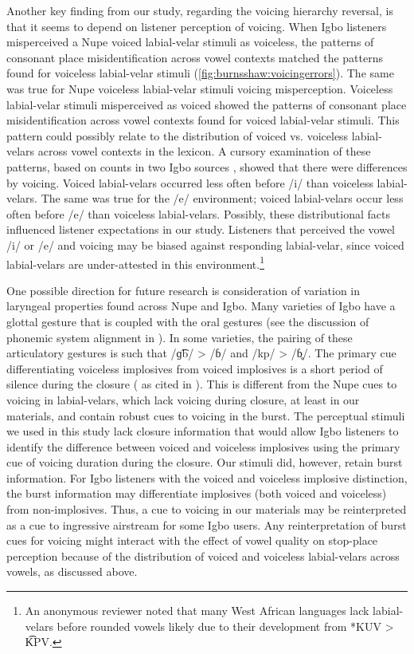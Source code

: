 \documentclass[output=paper,colorlinks,citecolor=brown
]{langscibook}
\begin{document}
Another key finding from our study, regarding the voicing hierarchy reversal, is that it seems to depend on listener perception of voicing. When Igbo listeners misperceived a Nupe voiced labial-velar stimuli as voiceless, the patterns of consonant place misidentification across vowel contexts matched the patterns found for voiceless labial-velar stimuli (\ref{fig:burnsshaw:voicingerrors}). The same was true for Nupe voiceless labial-velar stimuli voicing misperception. Voiceless labial-velar stimuli misperceived as voiced showed the patterns of consonant place misidentification across vowel contexts found for voiced labial-velar stimuli. This pattern could possibly relate to the distribution of voiced vs. voiceless labial-velars across vowel contexts in the lexicon. A cursory examination of these patterns, based on counts in two Igbo sources \citep{Igwe1999, Echeruo1998}, showed that there were differences by voicing. Voiced labial-velars occurred less often before /i/ than voiceless labial-velars. The same was true for the /e/ environment; voiced labial-velars occur less often before /e/ than voiceless labial-velars. Possibly, these distributional facts influenced listener expectations in our study. Listeners that perceived the vowel /i/ or /e/ and voicing may be biased against responding labial-velar, since voiced labial-velars are under-attested in this environment.\footnote{An anonymous reviewer noted that many West African languages lack labial-velars before rounded vowels likely due to their development from *KUV > K͡PV.}

One possible direction for future research is consideration of variation in laryngeal properties found across Nupe and Igbo. Many varieties of Igbo have a glottal gesture that is coupled with the oral gestures (see the discussion of phonemic system alignment in ). In some varieties, the pairing of these articulatory gestures is such that /ɡ͡b/ > /ɓ/ and /kp/ > /ɓ̥/. The primary cue differentiating voiceless implosives from voiced implosives is a short period of silence during the closure (\citealt{Ladefoged1976} as cited in \citealt{McLaughlin2005}). This is different from the Nupe cues to voicing in labial-velars, which lack voicing during closure, at least in our materials, and contain robust cues to voicing in the burst. The perceptual stimuli we used in this study lack closure information that would allow Igbo listeners to identify the difference between voiced and voiceless implosives using the primary cue of voicing duration during the closure. Our stimuli did, however, retain burst information. For Igbo listeners with the voiced and voiceless implosive distinction, the burst information may differentiate implosives (both voiced and voiceless) from non-implosives. Thus, a cue to voicing in our materials may be reinterpreted as a cue to ingressive airstream for some Igbo users. Any reinterpretation of burst cues for voicing might interact with the effect of vowel quality on stop-place perception because of the distribution of voiced and voiceless labial-velars across vowels, as discussed above.
\end{document}
